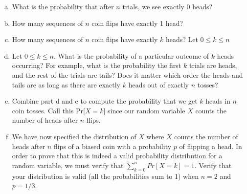 \documentclass[]{article}
\newif\ifsolutions
\renewcommand{\answer}[1]{{\color{mydarkblue}\textbf{Solution:}#1}}
\begin{document}
\begin{qunlist}
\begin{enumerate}[a)]
  \ifsolutions{ \answer {
  Each trial is independent, and the probability of a head for each trial is $p$ so we have probability $p^n$
  }} 
  \fi
\qpart
\item What is the probability that after $n$ trials, we see exactly $0$ heads?

 \ifsolutions{ \answer {
   Each trial is independent, and the probability of a head for each trial is $1-p$ so we have probability $(1-p)^n$
  }} 
  \fi
\qpart
\item How many sequences of $n$ coin flips have exactly 1 head?

 \ifsolutions{ \answer {
  $n$. We simply choose $1$ of the $n$ flips to be a head so we get $\binom{n}{1}$
  }} 
  \fi
\qpart
\item How many sequences of $n$ coin flips have exactly $k$ heads? Let  $0 \leq k \leq n$

 \ifsolutions{ \answer {
  This time, we count the ways to choose $k$ of the $n$ flips to be a head, so we get $\binom{n}{k}$
  }} 
  \fi 
\qpart
\item  Let  $0 \leq k \leq n$. What is the probability of a particular
  outcome of $k$ heads occurring? For example, what is the probability
  the first $k$ trials are heads, and the rest of the trials are
  tails? Does it matter which order the heads and tails are as long as
  there are exactly $k$ heads out of exactly $n$ tosses?
\qpart

 \ifsolutions{ \answer {
  Again, because the coin tosses are independent, we multiply the probability of the result of each coin toss. Since we have $k$ heads, the probability of those $k$ heads is $p^k$, but we still have count the probability the rest of the $n-k$ coins are tails which is $(1-p)^{n-k}$. Therefore we get $p^k(1-p)^{n-k}$. It does not matter what order the heads and tails are because multiplication is commutative (that is $a*b = b*a$).
  }} 
  \fi
\item Combine part d and e to compute the probability that we get $k$
  heads in $n$ coin tosses. Call this Pr[$X = k$] since our random variable $X$ counts the number of heads after $n$ flips. 
  
 \ifsolutions{ \answer {
  Part e computes the probability of a particular sequence of $k$ heads and $n-k$ tails. Part d counts \textit{how many} of these sequences exist. Therefore, to count the probability of getting $k$ heads in $n$ coin tosses we multiply our answer to part d and part e. $Pr[X = k] = \binom{n}{k}p^k(1-p)^{n-k}$
  }} 
  \fi
\qpart
\item We have now specified the distribution of $X$ where $X$ counts
  the number of heads after $n$ flips of a biased coin with a
  probability $p$ of flipping a head. In order to prove that this is
  indeed a valid probability distribution for a random variable, we
  must verify that $\sum\nolimits_{k=0}^n Pr[X=k] = 1$. Verify that
  your distribution is valid (all the probabilities sum to 1) when
  $n=2$ and $p=1/3$.  
  

\end{enumerate}
\end{qunlist}
\end{document}
